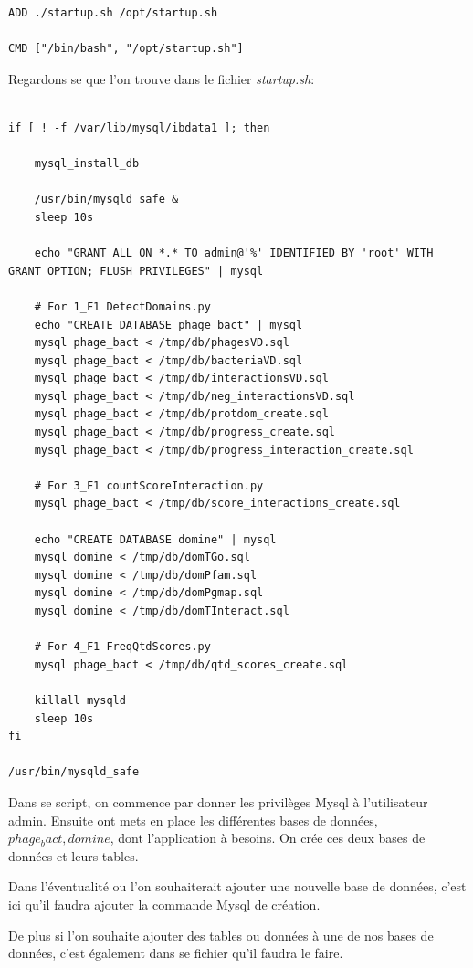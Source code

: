 \begin{lstlisting}[frame=single]
ADD ./startup.sh /opt/startup.sh

CMD ["/bin/bash", "/opt/startup.sh"]
\end{lstlisting}

Regardons se que l'on trouve dans le fichier \emph{startup.sh}:

\begin{lstlisting}[frame=single]

if [ ! -f /var/lib/mysql/ibdata1 ]; then

	mysql_install_db

	/usr/bin/mysqld_safe &
	sleep 10s

	echo "GRANT ALL ON *.* TO admin@'%' IDENTIFIED BY 'root' WITH GRANT OPTION; FLUSH PRIVILEGES" | mysql

	# For 1_F1 DetectDomains.py
	echo "CREATE DATABASE phage_bact" | mysql
	mysql phage_bact < /tmp/db/phagesVD.sql
	mysql phage_bact < /tmp/db/bacteriaVD.sql
	mysql phage_bact < /tmp/db/interactionsVD.sql
	mysql phage_bact < /tmp/db/neg_interactionsVD.sql
	mysql phage_bact < /tmp/db/protdom_create.sql
	mysql phage_bact < /tmp/db/progress_create.sql
	mysql phage_bact < /tmp/db/progress_interaction_create.sql

    # For 3_F1 countScoreInteraction.py
	mysql phage_bact < /tmp/db/score_interactions_create.sql

	echo "CREATE DATABASE domine" | mysql
    mysql domine < /tmp/db/domTGo.sql
    mysql domine < /tmp/db/domPfam.sql
    mysql domine < /tmp/db/domPgmap.sql
    mysql domine < /tmp/db/domTInteract.sql

    # For 4_F1 FreqQtdScores.py
	mysql phage_bact < /tmp/db/qtd_scores_create.sql

	killall mysqld
	sleep 10s
fi

/usr/bin/mysqld_safe
\end{lstlisting}

Dans se script, on commence par donner les privilèges Mysql à l'utilisateur admin. Ensuite ont mets en place les différentes bases de données, \emph{$phage_bact, domine$}, dont l'application à besoins. On crée ces deux bases de données et leurs tables.

Dans l'éventualité ou l'on souhaiterait ajouter une nouvelle base de données, c'est ici qu'il faudra ajouter la commande Mysql de création.

De plus si l'on souhaite ajouter des tables ou données à une de nos bases de données, c'est également dans se fichier qu'il faudra le faire.

